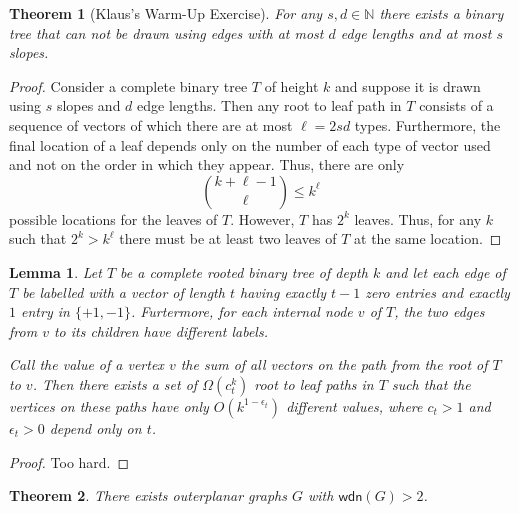 \documentclass{article}
\newtheorem{lem}{Lemma}
\newtheorem{thm}{Theorem}
\newcommand{\wdn}{\mathsf{wdn}}
\begin{document}
\begin{thm}[Klaus's Warm-Up Exercise]
For any $s,d\in\mathbb{N}$ there exists a binary tree that can not be
drawn using edges with at most $d$ edge lengths and at most $s$ slopes.
\end{thm}

\begin{proof}
Consider a complete binary tree $T$ of height $k$ and suppose it is
drawn using $s$ slopes and $d$ edge lengths.  Then any root to leaf
path in $T$ consists of a sequence of vectors of which there are 
at most $\ell=2sd$ types.  Furthermore, the final location of a leaf
depends only on the number of each type of vector used and not on the
order in which they appear.  Thus, there are only 
\[
           {k+\ell-1 \choose \ell} \le k^\ell
\]
possible locations for the leaves of $T$.  However, $T$
has $2^k$ leaves.  Thus, for any $k$ such that $2^k> k^\ell$ there
must be at least two leaves of $T$ at the same location.
\end{proof}


\begin{lem}\label{lem:random-walk}
Let $T$ be a complete rooted binary tree of depth $k$ and let each
edge of $T$ be labelled with a vector of length $t$ having exactly
$t-1$ zero entries and exactly $1$ entry in $\{+1,-1\}$.  Furtermore,
for each internal node $v$ of $T$, the two edges from $v$ to its
children have different labels.

Call the \emph{value} of a vertex $v$ the sum of all vectors on the
path from the root of $T$ to $v$.  Then there exists a set of
$\Omega(c_t^k)$ root to leaf paths in $T$ such that the vertices on
these paths have only $O(k^{1-\epsilon_t})$ different values, where
$c_t > 1$ and $\epsilon_t > 0$ depend only on $t$.
\end{lem}

\begin{proof}
Too hard.
\end{proof}

\begin{thm}
There exists outerplanar graphs $G$ with $\wdn(G) > 2$.
\end{thm}
\end{document}
